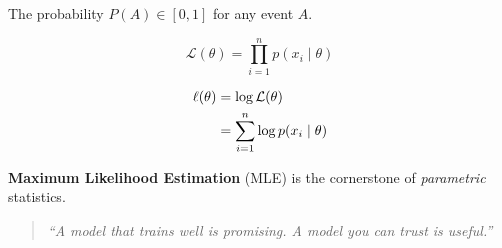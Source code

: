 %

The probability $P(A) \in [0, 1]$ for any event $A$.

%
%

\begin{equation}
  \mathcal{L}(\theta) = \prod_{i=1}^{n} p(x_i \mid \theta)
  \label{eq:likelihood}
\end{equation}


\begin{align}
  \ell(\theta)
    &= \log \mathcal{L}(\theta) \notag \\
    &= \sum_{i=1}^{n} \log p(x_i \mid \theta)
    \label{eq:loglik}
\end{align}

%

\textbf{Maximum Likelihood Estimation} (MLE) is the cornerstone of
\textit{parametric} statistics.

%
%

\begin{quote}
  \itshape
  ``A model that trains well is promising.
    A model you can trust is useful.''
\end{quote}

%
%

